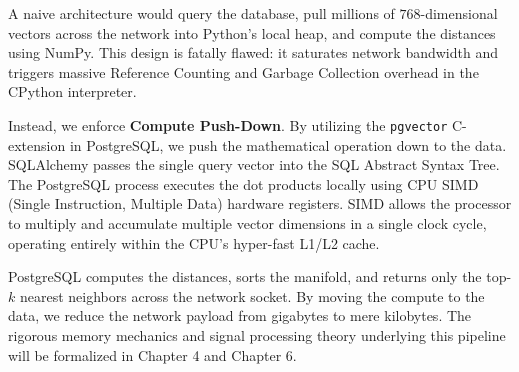 A naive architecture would query the database, pull millions of $768$-dimensional vectors across the network into Python's local heap, and compute the distances using NumPy. This design is fatally flawed: it saturates network bandwidth and triggers massive Reference Counting and Garbage Collection overhead in the CPython interpreter.

Instead, we enforce \textbf{Compute Push-Down}. By utilizing the \texttt{pgvector} C-extension in PostgreSQL, we push the mathematical operation down to the data. SQLAlchemy passes the single query vector into the SQL Abstract Syntax Tree. The PostgreSQL process executes the dot products locally using CPU SIMD (Single Instruction, Multiple Data) hardware registers. SIMD allows the processor to multiply and accumulate multiple vector dimensions in a single clock cycle, operating entirely within the CPU's hyper-fast L1/L2 cache.

PostgreSQL computes the distances, sorts the manifold, and returns only the top-$k$ nearest neighbors across the network socket. By moving the compute to the data, we reduce the network payload from gigabytes to mere kilobytes. The rigorous memory mechanics and signal processing theory underlying this pipeline will be formalized in Chapter 4 and Chapter 6.

